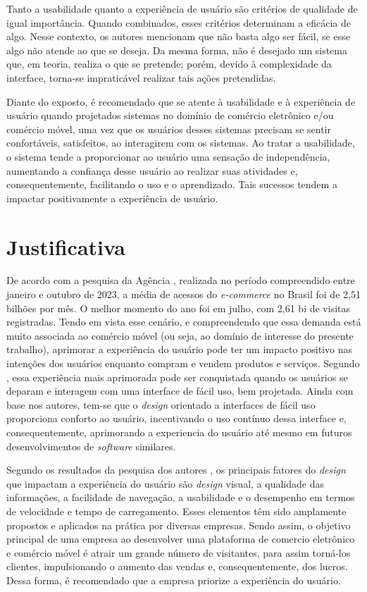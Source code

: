 Tanto a usabilidade quanto a experiência de usuário são critérios de qualidade de igual importância. Quando combinados, esses critérios determinam a eficácia de algo. Nesse contexto,  os autores  mencionam que não basta algo ser fácil, se esse algo não atende ao que se deseja. Da mesma forma, não é desejado um sistema que, em teoria, realiza o que se pretende; porém, devido à complexidade da interface, torna-se impraticável realizar tais ações pretendidas.

Diante do exposto, é recomendado que se atente à usabilidade e à experiência de usuário quando projetados sistemas no domínio de comércio eletrônico e/ou comércio móvel, uma vez que os usuários desses sistemas precisam se sentir confortáveis, satisfeitos, ao interagirem com os sistemas. Ao tratar a usabilidade, o sistema tende a proporcionar ao usuário uma sensação de independência, aumentando a confiança desse usuário ao realizar suas atividades e, consequentemente, facilitando o uso e o aprendizado. Tais sucessos tendem a impactar positivamente a experiência de usuário.



\section{Justificativa} 
    \label{jus}
    
De acordo com a pesquisa da Agência , realizada no período compreendido entre janeiro e outubro de 2023, a média de acessos do \textit{e-commerce} no Brasil foi de 2,51 bilhões por mês. O melhor momento do ano foi em julho, com 2,61 bi de visitas registradas. Tendo em vista esse cenário, e compreendendo que essa demanda está muito associada ao comércio móvel (ou seja, ao domínio de interesse do presente trabalho), aprimorar a experiência do usuário pode ter um impacto positivo nas intenções dos usuários enquanto compram e vendem produtos e serviços. Segundo , essa experiência mais aprimorada pode ser conquistada quando os usuários se deparam e interagem com uma interface de fácil uso, bem projetada. Ainda com base nos autores, tem-se que o \textit{design} orientado a interfaces de fácil uso proporciona conforto ao usuário, incentivando o uso contínuo dessa interface e, consequentemente, aprimorando a experiencia do usuário até mesmo em futuros desenvolvimentos de \textit{software} similares.

Segundo os resultados da pesquisa dos autores , os principais fatores do \textit{design} que impactam a experiência do usuário são \textit{design} visual, a qualidade das informações, a facilidade de navegação, a usabilidade e o desempenho em termos de velocidade e tempo de carregamento. Esses elementos têm sido amplamente propostos e aplicados na prática por diversas empresas. Sendo assim, o objetivo principal de uma empresa ao desenvolver uma plataforma de comercio eletrônico e comércio móvel é atrair um grande número de visitantes, para assim torná-los clientes, impulsionando o aumento das vendas e, consequentemente, dos lucros. Dessa forma, é recomendado que a empresa priorize a experiência do usuário.

